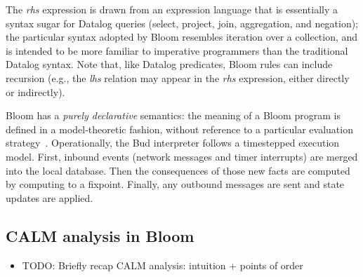 

The \emph{rhs} expression is drawn from an expression language that is
essentially a syntax sugar for Datalog queries (select, project, join,
aggregation, and negation); the particular syntax adopted by Bloom resembles
iteration over a collection, and is intended to be more familiar to imperative
programmers than the traditional Datalog syntax. Note that, like Datalog
predicates, Bloom rules can include recursion (e.g., the \emph{lhs} relation may
appear in the \emph{rhs} expression, either directly or indirectly).

Bloom has a \emph{purely declarative} semantics: the meaning of a Bloom program
is defined in a model-theoretic fashion, without reference to a particular
evaluation strategy~\cite{dedalus}. Operationally, the Bud interpreter follows a
timestepped execution model. First, inbound events (network messages and timer
interrupts) are merged into the local database. Then the consequences of those
new facts are computed by computing to a fixpoint. Finally, any outbound
messages are sent and state updates are applied.

\subsection{CALM analysis in Bloom}
\begin{itemize}
\item TODO: Briefly recap CALM analysis: intuition + points of order
\end{itemize}
